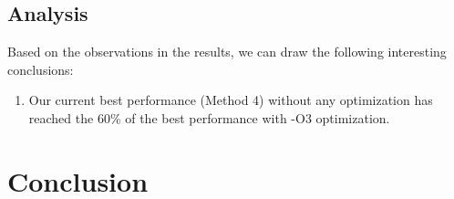 \documentclass[12pt]{article}
\begin{document}
\subsection{Analysis}
Based on the observations in the results, we can draw the following interesting 
conclusions:
\begin{enumerate}
\item Our current best performance (Method 4) without any optimization has reached 
the 60\% of the best performance with -O3 optimization.
\end{enumerate}

\section{Conclusion}
\end{document}
